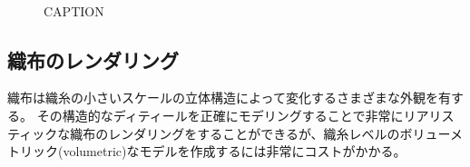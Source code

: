 \begin{figure}[htbp]
  \centering
{}\\
  \caption{CAPTION}
  \label{FMorpho}
\end{figure}

\newpage
\subsection{織布のレンダリング}

織布は織糸の小さいスケールの立体構造によって変化するさまざまな外観を有する。
その構造的なディティールを正確にモデリングすることで非常にリアリスティックな織布のレンダリングをすることができるが、織糸レベルのボリューメトリック(volumetric)なモデルを作成するには非常にコストがかかる。

